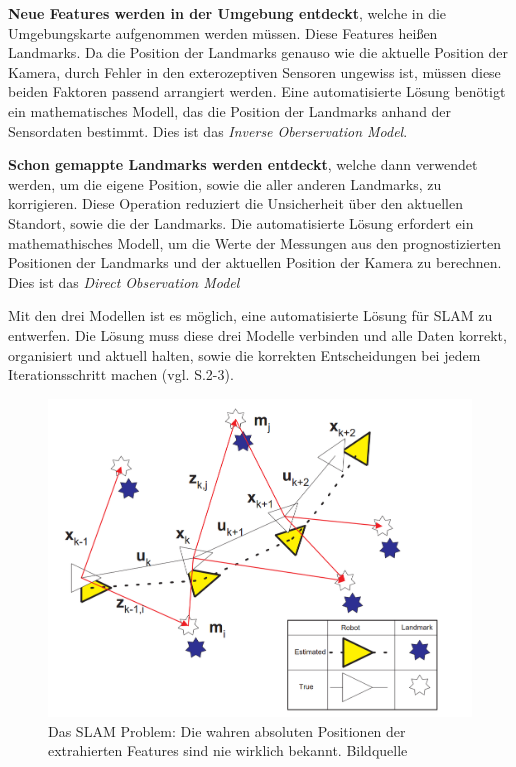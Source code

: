 \textbf{Neue Features werden in der Umgebung entdeckt}, welche in die Umgebungskarte aufgenommen werden müssen. Diese Features heißen \glqq Landmarks\grqq{}. Da die Position der Landmarks genauso wie die aktuelle Position der Kamera, durch Fehler in den exterozeptiven Sensoren ungewiss ist, müssen diese beiden Faktoren passend arrangiert werden. Eine automatisierte Lösung benötigt ein mathematisches Modell, das die Position der Landmarks anhand der Sensordaten bestimmt. Dies ist das \glqq{}\textit{Inverse Oberservation Model}\grqq{}.

\textbf{Schon gemappte Landmarks werden entdeckt}, welche dann verwendet werden, um die eigene Position, sowie die aller anderen Landmarks, zu korrigieren. Diese Operation reduziert die Unsicherheit über den aktuellen Standort, sowie die der Landmarks. Die automatisierte Lösung erfordert ein mathemathisches Modell, um die Werte der Messungen aus den prognostizierten Positionen der Landmarks und der aktuellen Position der Kamera zu berechnen. Dies ist das \glqq \textit{Direct Observation Model}\grqq

Mit den drei Modellen ist es möglich, eine automatisierte Lösung für SLAM zu entwerfen. Die Lösung muss diese drei Modelle verbinden und alle Daten korrekt, organisiert und aktuell halten, sowie die korrekten Entscheidungen bei jedem Iterationsschritt machen (vgl. \cite{ekf_slam} S.2-3).

\begin{figure}[H]
	\centering
	\includegraphics[scale=0.55]{slam_problem.png}
	\caption{Das SLAM Problem: Die wahren absoluten Positionen der extrahierten Features sind nie wirklich bekannt. Bildquelle \cite{slam}}
\end{figure} 

